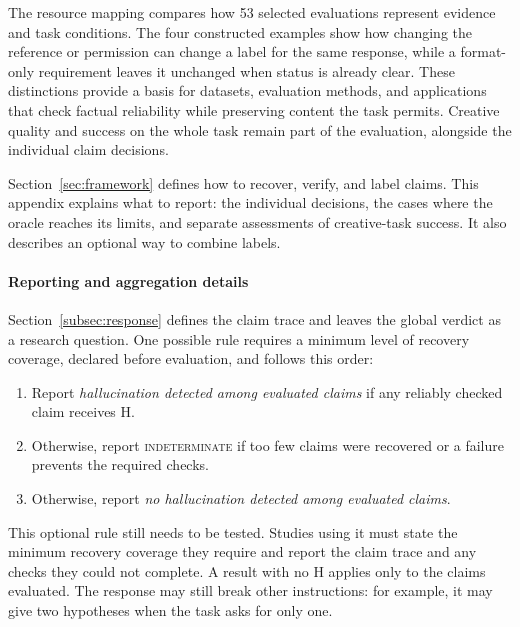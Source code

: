 \documentclass{clv2025}
\begin{document}
The resource mapping compares how 53 selected evaluations represent evidence
and task conditions. The four constructed examples show how changing the
reference or permission can change a label for the same response, while
a format-only requirement leaves it unchanged when status is already clear. These distinctions provide a basis for datasets, evaluation
methods, and applications that check factual reliability while preserving
content the task permits. Creative quality and success on the whole task
remain part of the evaluation, alongside the individual claim decisions.

\clearpage

\appendix

%
\makeatletter\def\@currentlabel{A}\makeatother\label{app:diagnostics}

Section~\ref{sec:framework} defines how to recover, verify, and label claims.
This appendix explains what to report: the individual decisions, the
cases where the oracle reaches its limits, and separate assessments of
creative-task success.
It also describes an optional way to combine labels.


\paragraph{Reporting and aggregation details}
Section~\ref{subsec:response} defines the claim trace and leaves the global
verdict as a research question. One possible rule requires a minimum level
of recovery coverage, declared before evaluation, and follows this order:
\begin{enumerate}
\item Report \emph{hallucination detected among evaluated claims} if any reliably checked claim receives H.
\item Otherwise, report \textsc{indeterminate} if too few claims were recovered
or a failure prevents the required checks.
\item Otherwise, report \emph{no hallucination detected among evaluated claims}.
\end{enumerate}
This optional rule still needs to be tested. Studies using it must state
the minimum recovery coverage they require and report the claim trace
and any checks they could not complete. A result with no H applies only
to the claims evaluated. The response may still break other instructions:
for example, it may give two hypotheses when the task asks
for only one.
\end{document}
